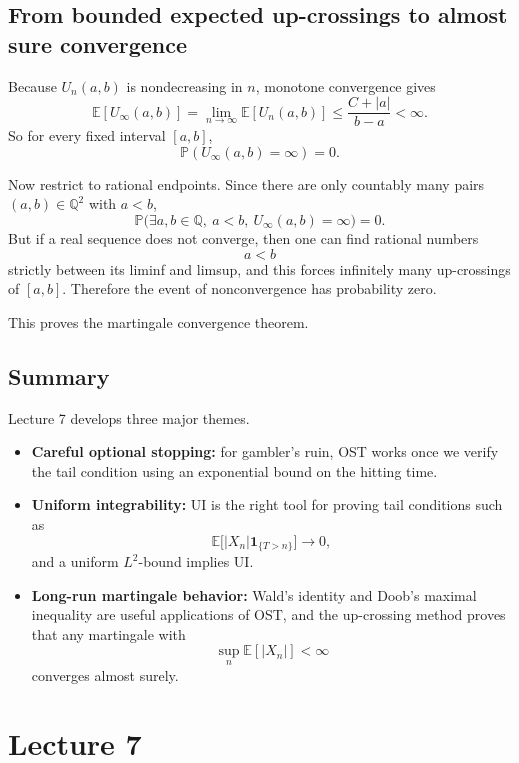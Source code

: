 \documentclass[11pt]{article}
\theoremstyle{definition}
\begin{document}
\subsection{From bounded expected up-crossings to almost sure convergence}

Because \(U_n(a,b)\) is nondecreasing in \(n\), monotone convergence gives
\[
\mathbb E[U_\infty(a,b)]
=
\lim_{n\to\infty}\mathbb E[U_n(a,b)]
\le
\frac{C+|a|}{b-a}<\infty.
\]
So for every fixed interval \([a,b]\),
\[
\mathbb P(U_\infty(a,b)=\infty)=0.
\]

Now restrict to rational endpoints. Since there are only countably many pairs \((a,b)\in\mathbb Q^2\) with \(a<b\),
\[
\mathbb P\bigl(\exists a,b\in\mathbb Q,\ a<b,\ U_\infty(a,b)=\infty\bigr)=0.
\]
But if a real sequence does not converge, then one can find rational numbers
\[
a<b
\]
strictly between its liminf and limsup, and this forces infinitely many up-crossings of \([a,b]\). Therefore the event of nonconvergence has probability zero.

This proves the martingale convergence theorem.

\subsection{Summary}

\begin{summarybox}
Lecture 7 develops three major themes.

\begin{itemize}[leftmargin=2em]
    \item \textbf{Careful optional stopping:} for gambler's ruin, OST works once we verify the tail condition using an exponential bound on the hitting time.
    \item \textbf{Uniform integrability:} UI is the right tool for proving tail conditions such as
    \[
    \mathbb E\bigl[|X_n|\mathbf 1_{\{T>n\}}\bigr]\to 0,
    \]
    and a uniform \(L^2\)-bound implies UI.
    \item \textbf{Long-run martingale behavior:} Wald's identity and Doob's maximal inequality are useful applications of OST, and the up-crossing method proves that any martingale with
    \[
    \sup_n \mathbb E[|X_n|]<\infty
    \]
    converges almost surely.
\end{itemize}
\end{summarybox}

\clearpage

\section{Lecture 7}
\end{document}

